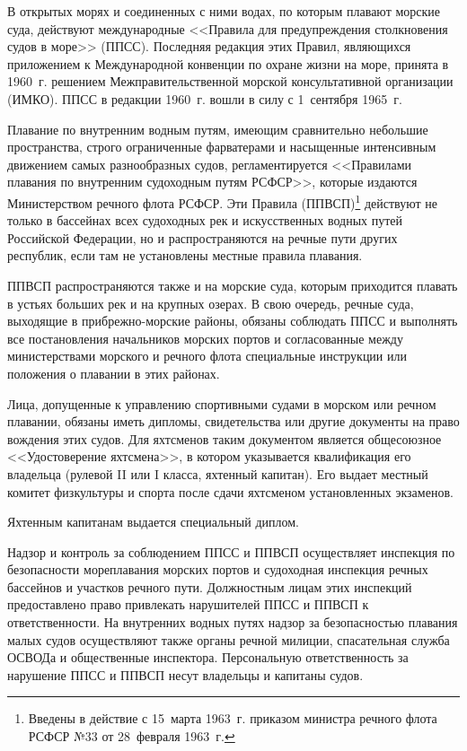 \documentclass[a4paper, 12pt, twoside, final]{scrbook}
\begin{document}
В открытых морях и соединенных с ними водах, по которым плавают морские суда, действуют международные <<Правила для предупреждения столкновения судов в море>> (ППСС). Последняя редакция этих Правил, являющихся приложением к Международной конвенции по охране жизни на море, принята в 1960~г. решением Межправительственной морской консультативной организации (ИМКО). ППСС в редакции 1960~г. вошли в силу с 1~сентября 1965~г.{\sloppy\par}

Плавание по внутренним водным путям, имеющим сравнительно небольшие пространства, строго ограниченные фарватерами и насыщенные интенсивным движением самых разнообразных судов, регламентируется <<Правилами плавания по внутренним судоходным путям РСФСР>>, которые издаются Министерством речного флота РСФСР. Эти Правила (ППВСП)\footnote{Введены в действие с 15~марта 1963~г. приказом министра речного флота РСФСР №33 от 28~февраля 1963~г.} действуют не только в бассейнах всех судоходных рек и искусственных водных путей Российской Федерации, но и распространяются на речные пути других республик, если там не установлены местные правила плавания.

ППВСП распространяются также и на морские суда, которым приходится плавать в устьях больших рек и на крупных озерах. В свою очередь, речные суда, выходящие в прибрежно-морские районы, обязаны соблюдать ППСС и выполнять все постановления начальников морских портов и согласованные между министерствами морского и речного флота специальные инструкции или положения о плавании в этих районах.

Лица, допущенные к  управлению спортивными судами в морском или речном плавании, обязаны иметь дипломы, свидетельства или другие документы на право вождения этих судов. Для яхтсменов таким документом является общесоюзное <<Удостоверение яхтсмена>>, в котором указывается квалификация его владельца (рулевой II или I класса, яхтенный капитан). Его выдает местный комитет физкультуры и спорта после сдачи яхтсменом установленных экзаменов.

Яхтенным капитанам выдается специальный диплом.

Надзор и контроль за соблюдением ППСС и ППВСП осуществляет инспекция по безопасности мореплавания морских портов и судоходная инспекция речных бассейнов и участков речного пути. Должностным лицам этих инспекций предоставлено право привлекать нарушителей ППСС и ППВСП к ответственности. На внутренних водных путях надзор за безопасностью плавания малых судов осуществляют также органы речной милиции, спасательная служба ОСВОДа и общественные инспектора. Персональную ответственность за нарушение ППСС и ППВСП несут владельцы и капитаны судов.
\end{document}
